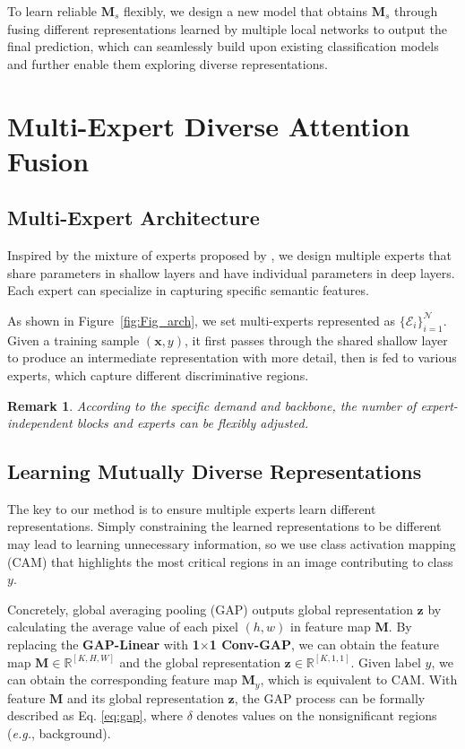 \documentclass[letterpaper]{article} %
\newtheorem{remark}{Remark}
\newcommand{\eg}{{\emph{e.g.}}}
\begin{document}
To learn reliable $\boldsymbol{M}_s$ flexibly, we design a new model that obtains $\boldsymbol{M}_s$ through fusing different representations learned by multiple local networks to output the final prediction, which can seamlessly build upon existing classification models and further enable them exploring diverse representations. 

\section{Multi-Expert Diverse Attention Fusion}
\subsection{Multi-Expert Architecture}
Inspired by the mixture of experts proposed by \cite{shazeer2017moe}, 
we design multiple experts that share parameters in shallow layers and have individual parameters in deep layers. Each expert can specialize in capturing specific semantic features. 

As shown in Figure~\ref{fig:Fig_arch}, we set multi-experts represented as $\{\mathcal{E}_i\}_{i=1}^\mathcal{N}$. Given a training sample $(\boldsymbol{x}, y)$, it first passes through the shared shallow layer to produce an intermediate representation with more detail, then is fed to various experts, which capture different discriminative regions. 

\begin{remark}
According to the specific demand and backbone, the number of expert-independent blocks and experts can be flexibly adjusted.
\end{remark}

\subsection{Learning Mutually Diverse Representations}
The key to our method is to ensure multiple experts learn different representations. Simply constraining the learned representations to be different may lead to learning unnecessary information, so we use class activation mapping (CAM) \cite{zhou2016learning} that highlights the most critical regions in an image contributing to class $y$. 

Concretely, global averaging pooling (GAP) outputs global representation $\boldsymbol{z}$ by calculating the average value of each pixel $(h,w)$ in feature map $\boldsymbol{M}$. By replacing the \textbf{GAP-Linear} with \textbf{1$\times$1 Conv-GAP}, we can obtain the feature map $\boldsymbol{M}\in\mathbb{R}^{[K,H,W]}$ and the global representation $\boldsymbol{z}\in\mathbb{R}^{[K,1,1]}$. Given label $y$, we can obtain the corresponding feature map $\boldsymbol{M}_y$, which is equivalent to CAM. With feature $\boldsymbol{M}$ and its global representation $\boldsymbol{z}$, the GAP process can be formally described as Eq. \eqref{eq:gap}, where $\delta$ denotes values on the nonsignificant regions (\eg, background).
\end{document}
